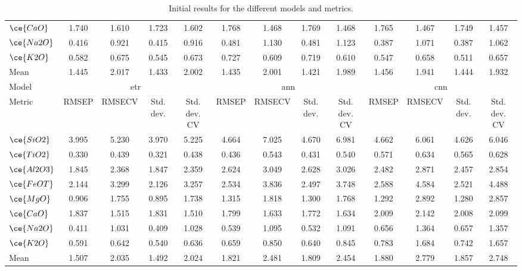 \begin{table*}[]
{\begin{tabular}{l|cccc|cccc|cccc}
$\ce{CaO}$ & 1.740 & 1.610 & 1.723 & 1.602 & 1.768 & 1.468 & 1.769 & 1.468 & 1.765 & 1.467 & 1.749 & 1.457 \\
$\ce{Na2O}$ & 0.416 & 0.921 & 0.415 & 0.916 & 0.481 & 1.130 & 0.481 & 1.123 & 0.387 & 1.071 & 0.387 & 1.062 \\
$\ce{K2O}$ & 0.582 & 0.675 & 0.545 & 0.673 & 0.727 & 0.609 & 0.719 & 0.610 & 0.547 & 0.658 & 0.511 & 0.657 \\
\hline
Mean & 1.445 & 2.017 & 1.433 & 2.002 & 1.435 & 2.001 & 1.421 & 1.989 & 1.456 & 1.941 & 1.444 & 1.932 \\
\hline
Model & \multicolumn{4}{c}{\gls{etr}} & \multicolumn{4}{c}{\gls{ann}} & \multicolumn{4}{c}{\gls{cnn}} \\
Metric & \multicolumn{1}{c}{RMSEP} & \multicolumn{1}{c}{RMSECV} & \multicolumn{1}{c}{Std. dev.} & \multicolumn{1}{c}{Std. dev. CV} & \multicolumn{1}{c}{RMSEP} & \multicolumn{1}{c}{RMSECV} & \multicolumn{1}{c}{Std. dev.} & \multicolumn{1}{c}{Std. dev. CV} & \multicolumn{1}{c}{RMSEP} & \multicolumn{1}{c}{RMSECV} & \multicolumn{1}{c}{Std. dev.} & \multicolumn{1}{c}{Std. dev. CV} \\
\hline
$\ce{SiO2}$ & 3.995 & 5.230 & 3.970 & 5.225 & 4.664 & 7.025 & 4.670 & 6.981 & 4.662 & 6.061 & 4.626 & 6.046 \\
$\ce{TiO2}$ & 0.330 & 0.439 & 0.321 & 0.438 & 0.436 & 0.543 & 0.431 & 0.540 & 0.571 & 0.634 & 0.565 & 0.628 \\
$\ce{Al2O3}$ & 1.845 & 2.368 & 1.847 & 2.359 & 2.624 & 3.049 & 2.628 & 3.026 & 2.482 & 2.871 & 2.457 & 2.854 \\
$\ce{FeOT}$ & 2.144 & 3.299 & 2.126 & 3.257 & 2.534 & 3.836 & 2.497 & 3.748 & 2.588 & 4.584 & 2.521 & 4.488 \\
$\ce{MgO}$ & 0.906 & 1.755 & 0.895 & 1.738 & 1.315 & 1.818 & 1.300 & 1.768 & 1.292 & 2.892 & 1.280 & 2.857 \\
$\ce{CaO}$ & 1.837 & 1.515 & 1.831 & 1.510 & 1.799 & 1.633 & 1.772 & 1.634 & 2.009 & 2.142 & 2.008 & 2.099 \\
$\ce{Na2O}$ & 0.411 & 1.031 & 0.409 & 1.028 & 0.539 & 1.095 & 0.532 & 1.091 & 0.656 & 1.364 & 0.657 & 1.357 \\
$\ce{K2O}$ & 0.591 & 0.642 & 0.540 & 0.636 & 0.659 & 0.850 & 0.640 & 0.845 & 0.783 & 1.684 & 0.742 & 1.657 \\
\hline
Mean & 1.507 & 2.035 & 1.492 & 2.024 & 1.821 & 2.481 & 1.809 & 2.454 & 1.880 & 2.779 & 1.857 & 2.748 \\
\hline
\end{tabular}%
}
\caption{Initial results for the different models and metrics.}
\label{tab:init_results}
\end{table*}
